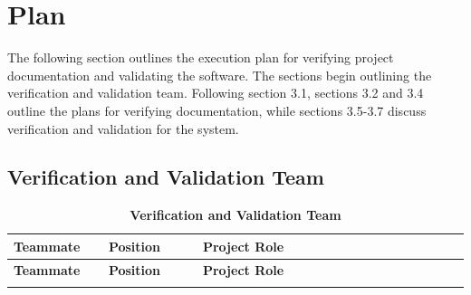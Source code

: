 \documentclass[12pt, titlepage]{article}
\begin{document}
\section{Plan}
\label{section:JustPlan}
The following section outlines the execution plan for verifying project documentation and validating the software. The sections begin outlining the verification and validation team. Following section 3.1, sections 3.2 and 3.4 outline the plans for verifying documentation, while sections 3.5-3.7 discuss verification and validation for the system.

\subsection{Verification and Validation Team}
\begin{longtable}{|>{\raggedright\arraybackslash}p{0.21\linewidth} | >{\raggedright\arraybackslash}p{0.21\linewidth} | >{\raggedright\arraybackslash}p{0.60\linewidth}| >{\raggedright\arraybackslash}p{0.21\linewidth}| }
    \caption{\bf Verification and Validation Team} \label{tab:my_label} \\
    
    \hline
    \textbf{Teammate} & \textbf{Position} & \textbf{Project Role}\\
    \hline
    \endfirsthead
    
    \hline
    \textbf{Teammate} & \textbf{Position} & \textbf{Project Role}\\
    \hline
    \endhead
    
    \hline
    \endfoot
    
    \hline
    \endlastfoot



\end{longtable}
\end{document}
